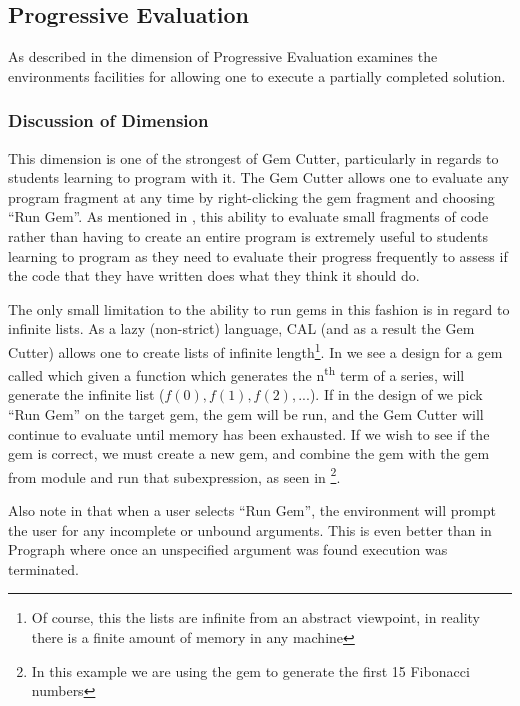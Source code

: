 
\subsection{Progressive Evaluation}

As described in  the dimension of Progressive Evaluation examines the environments facilities for allowing one to execute a partially completed solution.

\subsubsection{Discussion of Dimension}

This dimension is one of the strongest of Gem Cutter, particularly in regards to students learning to program with it.  The Gem Cutter allows one to evaluate any program fragment at any time by right-clicking the gem fragment and choosing ``Run Gem''.  As mentioned in , this ability to evaluate small fragments of code rather than having to create an entire program is extremely useful to students learning to program as they need to evaluate their progress frequently to assess if the code that they have written does what they think it should do.

The only small limitation to the ability to run gems in this fashion is in regard to infinite lists.  As a lazy (non-strict) language, CAL (and as a result the Gem Cutter) allows one to create lists of infinite length\footnote{Of course, this the lists are infinite from an abstract viewpoint, in reality there is a finite amount of memory in any machine}.  In  we see a design for a gem called  which given a function which generates the n\textsuperscript{th} term of a series, will generate the infinite list (\(f(0),f(1),f(2),...\)).  If in the design of  we pick ``Run Gem'' on the target gem, the gem will be run, and the Gem Cutter will continue to evaluate  until memory has been exhausted.  If we wish to see if the gem is correct, we must create a new gem, and combine the  gem with the  gem from  module and run that subexpression, as seen in \footnote{In this example we are using the  gem to generate the first 15 Fibonacci numbers}.

Also note in  that when a user selects ``Run Gem'', the environment will prompt the user for any incomplete or unbound arguments.  This is even better than in Prograph where once an unspecified argument was found execution was terminated.

